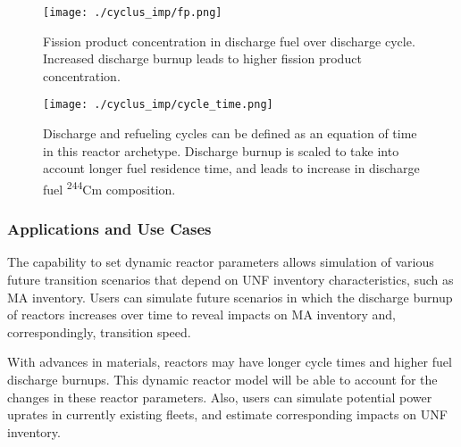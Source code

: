 \begin{figure}
    \centering
    \texttt{[image: ./cyclus\_imp/fp.png]}
    \caption{Fission product concentration in discharge fuel over discharge cycle. Increased discharge burnup leads to higher fission product concentration.}
    \label{fig:cyclus_fp}
\end{figure}


\begin{figure}
    \centering
    \texttt{[image: ./cyclus\_imp/cycle\_time.png]}
    \caption{Discharge and refueling cycles can be defined as an equation of time in this reactor archetype. Discharge burnup is scaled to take into account longer fuel residence time, and leads to increase in discharge fuel \textsuperscript{244}Cm composition.
    }
    \label{fig:cyclus_time}
\end{figure}

\subsubsection{Applications and Use Cases}

The capability to set dynamic reactor parameters
allows simulation of various future transition scenarios
that depend on \gls{UNF} inventory characteristics,
such as \gls{MA} inventory. 
Users can simulate future scenarios in which the discharge
burnup of reactors increases over time to reveal
impacts on \gls{MA} inventory and, correspondingly,
transition speed. 

With
advances in materials, reactors may have longer
cycle times and higher fuel discharge burnups.
This dynamic reactor model will be able to account
for the changes in these reactor parameters.
Also, users can simulate potential
power uprates in currently existing fleets, and
estimate corresponding impacts on \gls{UNF} inventory.
\FloatBarrier